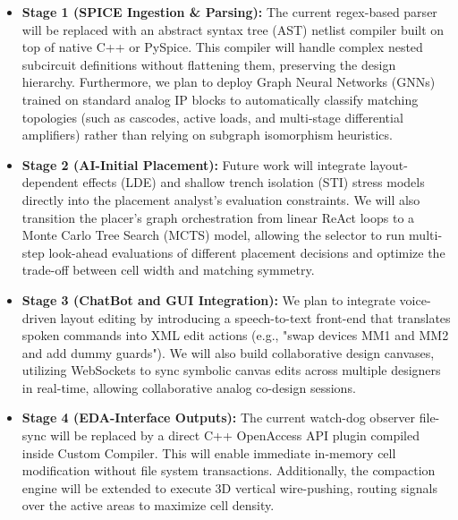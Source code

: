 \begin{itemize}
    \item \textbf{Stage 1 (SPICE Ingestion \& Parsing):} The current regex-based parser will be replaced with an abstract syntax tree (AST) netlist compiler built on top of native C++ or PySpice. This compiler will handle complex nested subcircuit definitions without flattening them, preserving the design hierarchy. Furthermore, we plan to deploy Graph Neural Networks (GNNs) trained on standard analog IP blocks to automatically classify matching topologies (such as cascodes, active loads, and multi-stage differential amplifiers) rather than relying on subgraph isomorphism heuristics.
    \item \textbf{Stage 2 (AI-Initial Placement):} Future work will integrate layout-dependent effects (LDE) and shallow trench isolation (STI) stress models directly into the placement analyst's evaluation constraints. We will also transition the placer's graph orchestration from linear ReAct loops to a Monte Carlo Tree Search (MCTS) model, allowing the selector to run multi-step look-ahead evaluations of different placement decisions and optimize the trade-off between cell width and matching symmetry.
    \item \textbf{Stage 3 (ChatBot and GUI Integration):} We plan to integrate voice-driven layout editing by introducing a speech-to-text front-end that translates spoken commands into XML edit actions (e.g., "swap devices MM1 and MM2 and add dummy guards"). We will also build collaborative design canvases, utilizing WebSockets to sync symbolic canvas edits across multiple designers in real-time, allowing collaborative analog co-design sessions.
    \item \textbf{Stage 4 (EDA-Interface Outputs):} The current watch-dog observer file-sync will be replaced by a direct C++ OpenAccess API plugin compiled inside Custom Compiler. This will enable immediate in-memory cell modification without file system transactions. Additionally, the compaction engine will be extended to execute 3D vertical wire-pushing, routing signals over the active areas to maximize cell density.
\end{itemize}

